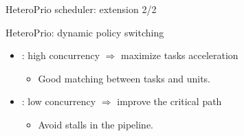 \begin{frame}[t]{HeteroPrio scheduler: extension 2/2}
    
  \begin{center}
  \end{center}


  \begin{block}{HeteroPrio: dynamic policy switching}
    \begin{itemize}
    \item<1-> : high concurrency $\Rightarrow$ maximize tasks acceleration
      \begin{itemize}
      \item[\dg{$\blacktriangle$}]<1-> Good matching between tasks
      and units. 
      \end{itemize}
    \item<2-> : low concurrency $\Rightarrow$ improve the critical path          
      \begin{itemize}
      \item[\dg{$\blacktriangle$}]<2-> Avoid stalls in the pipeline. 
      \end{itemize}
    \end{itemize}
  \end{block}
\end{frame}

